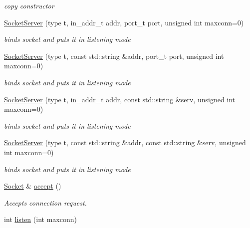 \begin{CompactItemize}
\begin{CompactList}\small\item\em copy constructor \item\end{CompactList}\item 
\hyperlink{classsocketpp_1_1SocketServer_73c5125f9e5a6cf03dc15f6d4250e345}{SocketServer} (type t, in\_\-addr\_\-t addr, port\_\-t port, unsigned int maxconn=0)
\begin{CompactList}\small\item\em binds socket and puts it in listening mode \item\end{CompactList}\item 
\hyperlink{classsocketpp_1_1SocketServer_2b43397fd614dc7953559d7372f1c6ca}{SocketServer} (type t, const std::string \&addr, port\_\-t port, unsigned int maxconn=0)
\begin{CompactList}\small\item\em binds socket and puts it in listening mode \item\end{CompactList}\item 
\hyperlink{classsocketpp_1_1SocketServer_d1c5c7df1da1c52df7a1fae7df4488b1}{SocketServer} (type t, in\_\-addr\_\-t addr, const std::string \&serv, unsigned int maxconn=0)
\begin{CompactList}\small\item\em binds socket and puts it in listening mode \item\end{CompactList}\item 
\hyperlink{classsocketpp_1_1SocketServer_ed1844f6c0c6e9e3b69e69903355d171}{SocketServer} (type t, const std::string \&addr, const std::string \&serv, unsigned int maxconn=0)
\begin{CompactList}\small\item\em binds socket and puts it in listening mode \item\end{CompactList}\item 
\hyperlink{classsocketpp_1_1Socket}{Socket} \& \hyperlink{classsocketpp_1_1SocketServer_de24bd723d353d62d034718a1d95c02f}{accept} ()
\begin{CompactList}\small\item\em Accepts connection request. \item\end{CompactList}\item 
int \hyperlink{classsocketpp_1_1SocketServer_034ddc2def5342b5a26264ffcb9e8e36}{listen} (int maxconn)

\end{CompactItemize}
